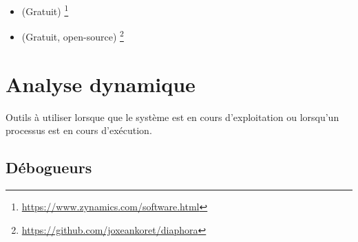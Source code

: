 \begin{itemize}
\item (Gratuit) \footnote{\url{https://www.zynamics.com/software.html}}

\item (Gratuit, open-source) \footnote{\url{https://github.com/joxeankoret/diaphora}}
\end{itemize}

\section{Analyse dynamique}

Outils à utiliser lorsque que le système est en cours d'exploitation ou lorsqu'un processus est en cours d'exécution.

\subsection{Débogueurs}

\myindex{\olly}

